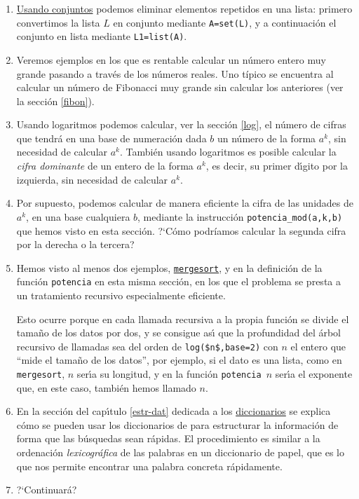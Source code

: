 \begin{enumerate}
 \item \hyperlink{conj}{Usando conjuntos} podemos eliminar elementos repetidos
en una lista:
primero convertimos la lista $L$  en conjunto mediante 
 \lstinline|A=set(L)|, y a continuaci\'on el conjunto en lista mediante
\lstinline|L1=list(A)|. 

\item Veremos ejemplos en los que es rentable calcular un n\'umero entero muy
grande pasando a trav\'es de los n\'umeros reales. Uno t\'ipico se encuentra al
calcular un n\'umero de Fibonacci muy grande sin calcular los anteriores (ver la
secci\'on \ref{fibon}).
 
 \item Usando logaritmos podemos calcular, ver la secci\'on \ref{log},  el
n\'umero de cifras que tendr\'a
en una base de numeraci\'on dada $b$ un n\'umero de la forma $a^k$,  sin
necesidad de calcular $a^k$. Tambi\'en usando logaritmos es posible calcular
la {\itshape cifra dominante} de un entero de la forma $a^k$, es decir, su
primer d\'{\i}gito por la izquierda, sin necesidad de calcular $a^k$. 

\item Por supuesto,  podemos calcular de manera eficiente la cifra de las
unidades de $a^k$, en una base cualquiera $b$,  mediante la instrucci\'on 
\lstinline|potencia_mod(a,k,b)| que hemos visto en esta secci\'on. ?`C\'omo
podr\'iamos calcular la segunda cifra por la derecha o la tercera?

\item Hemos visto al menos dos ejemplos, \hyperref[mergesort]{\tt mergesort}, y
en la definici\'on de la funci\'on \lstinline|potencia|
en esta misma secci\'on, en los que
el problema se presta a un tratamiento recursivo especialmente eficiente. 

Esto ocurre porque  en cada llamada recursiva a la propia funci\'on  se divide
el tama\~no de los datos por dos, y se consigue as\'{\i} que la profundidad del
\'arbol recursivo de llamadas sea del orden de \lstinline|log($n$,base=2)| con
$n$
el entero que ``mide el tama\~no de los datos'', por ejemplo,  si el dato es una
lista, como en \lstinline|mergesort|,  $n$ ser\'{\i}a su longitud, y en
la funci\'on \lstinline|potencia|~$n$ ser\'{\i}a el exponente que, en este caso,
tambi\'en
hemos llamado $n$.

\item En la secci\'on del cap\'{\i}tulo \ref{estr-dat} dedicada a los 
\hyperref[diccionarios]{diccionarios} se explica c\'omo se pueden usar los
diccionarios de {\sage} para estructurar la informaci\'on de forma que las
b\'usquedas sean r\'apidas. El procedimiento es similar a la ordenaci\'on
{\itshape lexicogr\'afica} de las palabras en un diccionario de papel, que es
lo que nos permite encontrar una palabra concreta r\'apidamente.  

\item {\sc  ?`Continuar\'a?}
\end{enumerate}


